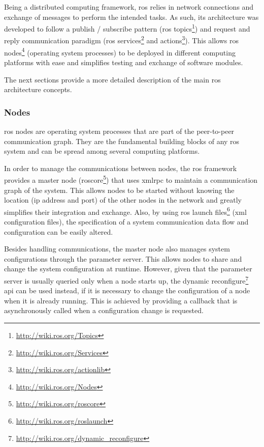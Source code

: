 Being a distributed computing framework, \gls{ros} relies in network connections and exchange of messages to perform the intended tasks. As such, its architecture was developed to follow a publish / subscribe pattern (\gls{ros} topics\footnote{\url{http://wiki.ros.org/Topics}}) and request and reply communication paradigm (\gls{ros} services\footnote{\url{http://wiki.ros.org/Services}} and actions\footnote{\url{http://wiki.ros.org/actionlib}}). This allows \gls{ros} nodes\footnote{\url{http://wiki.ros.org/Nodes}} (operating system processes) to be deployed in different computing platforms with ease and simplifies testing and exchange of software modules.

The next sections provide a more detailed description of the main \gls{ros} architecture concepts.


\subsubsection{Nodes}

\gls{ros} nodes are operating system processes that are part of the peer-to-peer communication graph. They are the fundamental building blocks of any \gls{ros} system and can be spread among several computing platforms.

In order to manage the communications between nodes, the \gls{ros} framework provides a master node (roscore\footnote{\url{http://wiki.ros.org/roscore}}) that uses \gls{xmlrpc} to maintain a communication graph of the system. This allows nodes to be started without knowing the location (\gls{ip} address and port) of the other nodes in the network and greatly simplifies their integration and exchange. Also, by using \gls{ros} launch files\footnote{\url{http://wiki.ros.org/roslaunch}} (\gls{xml} configuration files), the specification of a system communication data flow and configuration can be easily altered.

Besides handling communications, the master node also manages system configurations through the parameter server. This allows nodes to share and change the system configuration at runtime. However, given that the parameter server is usually queried only when a node starts up, the dynamic reconfigure\footnote{\url{http://wiki.ros.org/dynamic_reconfigure}} \gls{api} can be used instead, if it is necessary to change the configuration of a node when it is already running. This is achieved by providing a callback that is asynchronously called when a configuration change is requested.

